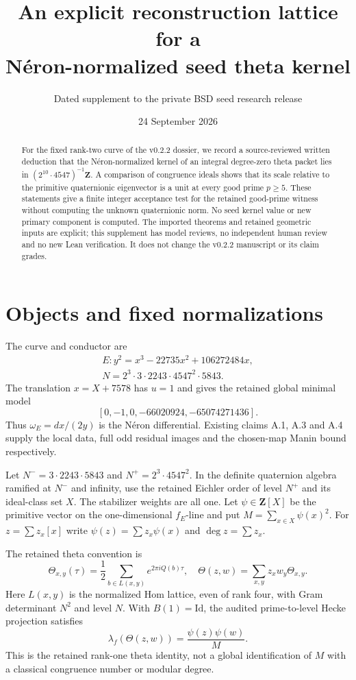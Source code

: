 \documentclass[11pt]{article}
\title{An explicit reconstruction lattice for a\protect\\ N\'eron-normalized seed theta kernel}
\author{Dated supplement to the private BSD seed research release}
\date{24 September 2026}
\newcommand{\Z}{\mathbf Z}
\begin{document}
\maketitle
\begin{abstract}
For the fixed rank-two curve of the v0.2.2 dossier, we record a source-reviewed
written deduction that the N\'eron-normalized kernel of an integral degree-zero
theta packet lies in $(2^{10}\cdot4547)^{-1}\Z$. A comparison of congruence
ideals shows that its scale relative to the primitive quaternionic eigenvector
is a unit at every good prime $p\ge5$. These statements give a finite integer
acceptance test for the retained good-prime witness without computing the
unknown quaternionic norm. No seed kernel value or new primary component is
computed. The imported theorems and retained geometric inputs are explicit;
this supplement has model reviews, no independent human review and no new
Lean verification. It does not change the v0.2.2 manuscript or its claim grades.
\end{abstract}

\section{Objects and fixed normalizations}
The curve and conductor are
\[
 \begin{gathered}
 E:y^2=x^3-22735x^2+106272484x,\\
 N=2^3\cdot3\cdot2243\cdot4547^2\cdot5843.
 \end{gathered}
\]
The translation $x=X+7578$ has $u=1$ and gives the retained global minimal
model
\[
 [0,-1,0,-66020924,-65074271436].
\]
Thus $\omega_E=dx/(2y)$ is the
N\'eron differential. Existing claims A.1, A.3 and A.4 supply the local data,
full odd residual images and the chosen-map Manin bound respectively.

Let $N^-=3\cdot2243\cdot5843$ and $N^+=2^3\cdot4547^2$. In the definite
quaternion algebra ramified at $N^-$ and infinity, use the retained Eichler
order of level $N^+$ and its ideal-class set $X$. The stabilizer weights are
all one. Let $\psi\in\Z[X]$ be the primitive vector on the one-dimensional
$f_E$-line and put $M=\sum_{x\in X}\psi(x)^2$. For $z=\sum z_x[x]$ write
$\psi(z)=\sum z_x\psi(x)$ and $\deg z=\sum z_x$.

The retained theta convention is
\[
 \Theta_{x,y}(\tau)=\frac12\sum_{b\in L(x,y)}e^{2\pi iQ(b)\tau},
 \quad\Theta(z,w)=\sum_{x,y}z_xw_y\Theta_{x,y}.
\]
Here $L(x,y)$ is the normalized Hom lattice, even of rank four, with Gram
determinant $N^2$ and level $N$. With $B(1)=\mathrm{Id}$, the audited
prime-to-level Hecke projection satisfies
\begin{equation}\label{oldkernel}
 \lambda_f(\Theta(z,w))=\frac{\psi(z)\psi(w)}{M}.
\end{equation}
This is the retained rank-one theta identity, not a global identification
of $M$ with a classical congruence number or modular degree.
\end{document}
